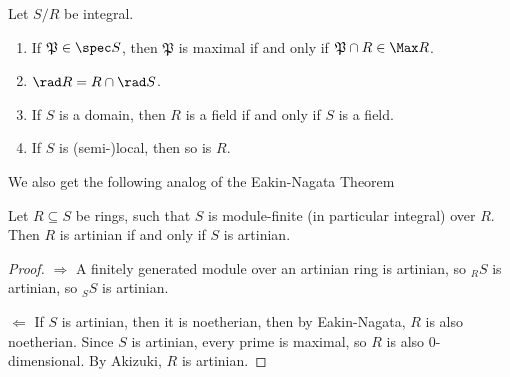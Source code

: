  \begin{corollary}
   Let $S/R$ be integral.
   \begin{enumerate}
     \item If $\mathfrak{P}\in \spec S$, then $\mathfrak{P}$ is maximal if and only if
     $\mathfrak{P}\cap R\in \Max R$.

     \item $\rad R = R\cap \rad S $.

     \item If $S$ is a domain, then $R$ is a field if and only if $S$ is a field.

     \item If $S$ is (semi-)local, then so is $R$.
   \end{enumerate}
 \end{corollary}
 We also get the following analog of the Eakin-Nagata Theorem
 \begin{corollary}
   Let $R\subseteq S$ be rings, such that $S$ is module-finite (in particular integral)
   over $R$. Then $R$ is artinian if and only if $S$ is artinian.
 \end{corollary}
 \begin{proof}
   $\Rightarrow$ A finitely generated module over an artinian ring is artinian, so ${}_R
   S$ is artinian, so ${}_S S$ is artinian.

   $\Leftarrow$ If $S$ is artinian, then it is noetherian, then by Eakin-Nagata, $R$ is
   also noetherian. Since $S$ is artinian, every prime is maximal, so $R$ is also
   0-dimensional. By Akizuki, $R$ is artinian.
 \end{proof}

